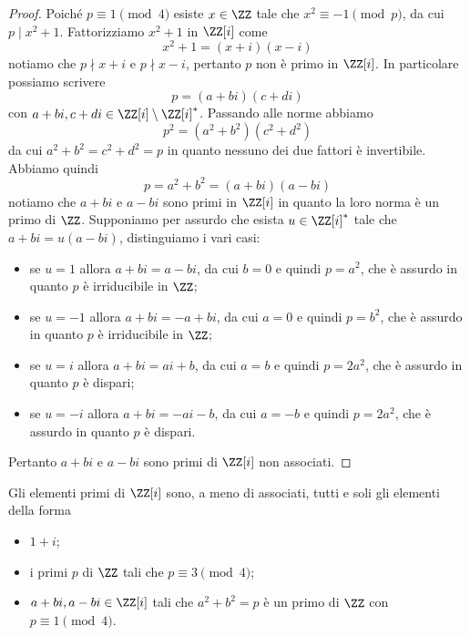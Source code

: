 \documentclass[11pt]{scrartcl}
\begin{document}
\begin{proof}
    Poiché $p \equiv 1 \pmod 4$ esiste $x \in \ZZ$ tale che $x^2 \equiv -1 \pmod p$,
    da cui $p \mid x^2 + 1$. Fattorizziamo $x^2 + 1$ in $\ZZ[i]$ come 
    \[
        x^2 + 1 = (x + i)(x - i)
    \]
    notiamo che $p\nmid x + i$ e $p \nmid x - i$, pertanto $p$ non è primo in $\ZZ[i]$.
    In particolare possiamo scrivere 
    \[
        p = (a + bi)(c + di)
    \]
    con $a + bi, c + di \in \ZZ[i] \setminus \ZZ[i]^*$. Passando alle norme 
    abbiamo
    \[
        p^2 = (a^2 + b^2)(c^2 + d^2)
    \]
    da cui $a^2 + b^2 = c^2 + d^2 = p$ in quanto nessuno dei due fattori è 
    invertibile. Abbiamo quindi 
    \[
        p = a^2 + b^2 = (a + bi)(a - bi)
    \]
    notiamo che $a + bi$ e $a - bi$ sono primi in $\ZZ[i]$ in quanto la loro 
    norma è un primo di $\ZZ$. Supponiamo per assurdo che esista $u \in \ZZ[i]^*$
    tale che $a + bi = u(a - bi)$, distinguiamo i vari casi:
    \begin{itemize}
        \item se $u = 1$ allora $a + bi = a - bi$, da cui $b = 0$ e quindi $p = a^2$,
        che è assurdo in quanto $p$ è irriducibile in $\ZZ$;
        \item se $u = -1$ allora $a + bi = -a + bi$, da cui $a = 0$ e quindi
        $p = b^2$, che è assurdo in quanto $p$ è irriducibile in $\ZZ$;
        \item se $u = i$ allora $a + bi = ai + b$, da cui $a = b$ e quindi $p = 
        2a^2$, che è assurdo in quanto $p$ è dispari;
        \item se $u = -i$ allora $a + bi = -ai - b$, da cui $a = -b$ e quindi
        $p = 2a^2$, che è assurdo in quanto $p$ è dispari.
    \end{itemize}
    Pertanto $a + bi$ e $a - bi$ sono primi di $\ZZ[i]$ non associati.
\end{proof}

\begin{proposition}
    Gli elementi primi di $\ZZ[i]$ sono, a meno di associati, tutti e soli
    gli elementi della forma
    \begin{itemize}
        \item $1 + i$;
        \item i primi $p$ di $\ZZ$ tali che $p \equiv 3 \pmod 4$;
        \item $a + bi, a - bi \in \ZZ[i]$ tali che $a^2 + b^2 = p$ è un primo
        di $\ZZ$ con $p \equiv 1 \pmod 4$.
    \end{itemize}
\end{proposition}
\end{document}
